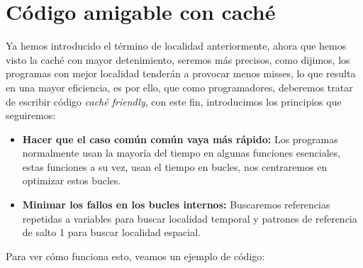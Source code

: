 \section{Código amigable con caché}
Ya hemos introducido el término de localidad anteriormente, ahora que hemos visto la caché con mayor detenimiento, seremos más precisos,
como dijimos, los programas con mejor localidad tenderán a provocar menos misses, lo que resulta en una mayor eficiencia, es por ello, que como 
programadores, deberemos tratar de escribir código \textit{caché friendly}, con este fin, introducimos los principios que seguiremos:
\begin{itemize}
    \item \textbf{Hacer que el caso común común vaya más rápido:} Los programas normalmente usan la mayoría del tiempo en algunas funciones esenciales,
        estas funciones a su vez, usan el tiempo en bucles, nos centraremos en optimizar estos bucles.
    \item \textbf{Minimar los fallos en los bucles internos:} Buscaremos referencias repetidas a variables para buscar localidad temporal y 
        patrones de referencia de salto 1 para buscar localidad espacial.
\end{itemize}
Para ver cómo funciona esto, veamos un ejemplo de código:
